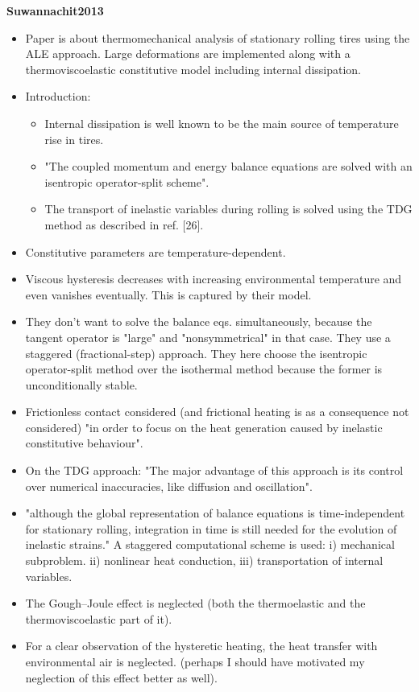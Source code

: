 \documentclass{article}
\begin{document}
\textbf{Suwannachit2013}
\begin{itemize}
\item Paper is about thermomechanical analysis of stationary rolling tires using the ALE approach. Large deformations are implemented along with a thermoviscoelastic constitutive model including internal dissipation.
\item Introduction:
\begin{itemize}
\item Internal dissipation is well known to be the main source of temperature rise in tires.
\item "The coupled momentum and energy balance equations are solved with an isentropic operator-split scheme".
\item The transport of inelastic variables during rolling is solved using the TDG method as described in ref. [26].
\end{itemize}
\item Constitutive parameters are temperature-dependent.
\item Viscous hysteresis decreases with increasing environmental temperature and even vanishes eventually. This is captured by their model.
\item They don't want to solve the balance eqs. simultaneously, because the tangent operator is "large" and "nonsymmetrical" in that case. They use a staggered (fractional-step) approach. They here choose the isentropic operator-split method over the isothermal method because the former is unconditionally stable.
\item Frictionless contact considered (and frictional heating is as a consequence not considered) "in order to focus on the heat generation caused by inelastic constitutive behaviour".
\item On the TDG approach: "The major advantage of this approach is its control over numerical inaccuracies, like diffusion and oscillation".
\item "although the global representation of balance equations is time-independent for stationary rolling, integration in time is still needed for the evolution of inelastic strains." A staggered computational scheme is used: i) mechanical subproblem. ii) nonlinear heat conduction, iii) transportation of internal variables.
\item The Gough--Joule effect is neglected (both the thermoelastic and the thermoviscoelastic part of it).
\item For a clear observation of the hysteretic heating, the heat transfer with environmental air is neglected. (perhaps I should have motivated my neglection of this effect better as well).

\end{itemize}
\end{document}
